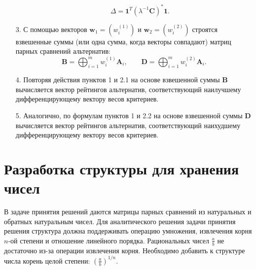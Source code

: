 \documentclass[specialist, substylefile = spbureport.rtx,
    subf,href,colorlinks=true, 12pt]{disser}
\begin{document}
\begin{itemize}
\begin{itemize}
\begin{equation}
        \Delta
        =
        \bm{1}^{T}(\lambda^{-1}\bm{C})^{\ast}\bm{1}.
        \end{equation}
        \end{itemize}
        \item[3.]
        С помощью векторов $\bm{w}_{1}=(w_{i}^{(1)})$ и $\bm{w}_{2}=(w_{i}^{(2)})$ строятся взвешенные суммы (или одна сумма, когда векторы совпадают) матриц парных сравнений альтернатив:
        \begin{equation}
        \bm{B}
        =
        \bigoplus_{i=1}^{m}w^{(1)}_{i}\bm{A}_{i},
        \qquad
        \bm{D}
        =
        \bigoplus_{i=1}^{m}w^{(2)}_{i}\bm{A}_{i}.
        \end{equation}
        \item[4.]
        Повторяя действия пунктов 1 и 2.1 на основе взвешенной суммы $\bm{B}$ вычисляется вектор рейтингов альтернатив, соответствующий наилучшему дифференцирующему вектору весов критериев.
        
        \item[5.]
        Аналогично, по формулам пунктов 1 и 2.2 на основе взвешенной суммы $\bm{D}$ вычисляется вектор рейтингов альтернатив, соответствующий наихудшему дифференцирующему вектору весов критериев.
        \end{itemize}

       
    \chapter{Разработка структуры для хранения чисел}

    В задаче принятия решений даются матрицы парных сравнений из натуральных и обратных натуральным чисел.
    Для аналитического решения задачи принятия решения структура должна поддерживать операцию умножения, извлечения корня $n$-ой степени и отношение линейного порядка.
    Рациональных чисел $\displaystyle \frac{a}{b}$ не достаточно из-за операции извлечения корня. 
    Необходимо добавить к структуре числа корень целой степени:  $\displaystyle \left(\frac{a}{b}\right)^{1/n}$.
\end{document}
